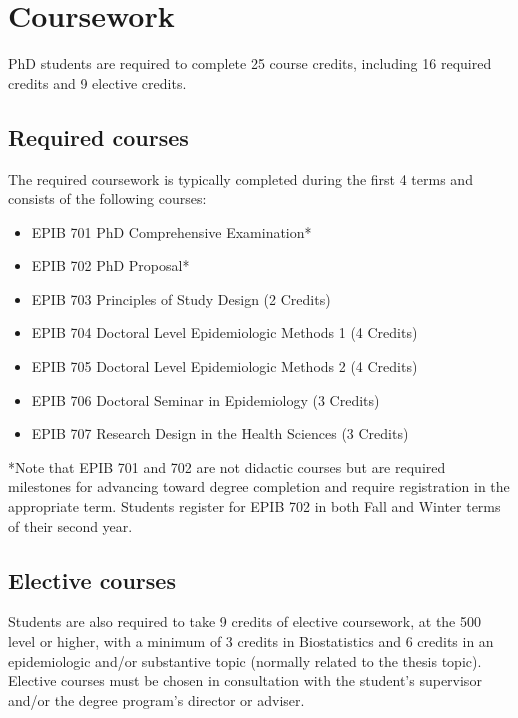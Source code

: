\documentclass[
]{book}
\providecommand{\tightlist}{%
  \setlength{\itemsep}{0pt}\setlength{\parskip}{0pt}}
\begin{document}
\hypertarget{coursework}{%
\chapter{Coursework}\label{coursework}}

PhD students are required to complete 25 course credits, including 16 required credits and 9 elective credits.

\hypertarget{required-courses}{%
\section{Required courses}\label{required-courses}}

The required coursework is typically completed during the first 4 terms and consists of the following courses:

\begin{itemize}
\tightlist
\item
  EPIB 701 PhD Comprehensive Examination*
\item
  EPIB 702 PhD Proposal*
\item
  EPIB 703 Principles of Study Design (2 Credits)
\item
  EPIB 704 Doctoral Level Epidemiologic Methods 1 (4 Credits)
\item
  EPIB 705 Doctoral Level Epidemiologic Methods 2 (4 Credits)
\item
  EPIB 706 Doctoral Seminar in Epidemiology (3 Credits)
\item
  EPIB 707 Research Design in the Health Sciences (3 Credits)
\end{itemize}

*Note that EPIB 701 and 702 are not didactic courses but are required milestones for advancing toward degree completion and require registration in the appropriate term. Students register for EPIB 702 in both Fall and Winter terms of their second year.

\hypertarget{elective-courses}{%
\section{Elective courses}\label{elective-courses}}

Students are also required to take 9 credits of elective coursework, at the 500 level or higher, with a minimum of 3 credits in Biostatistics and 6 credits in an epidemiologic and/or substantive topic (normally related to the thesis topic). Elective courses must be chosen in consultation with the student's supervisor and/or the degree program's director or adviser.
\end{document}
